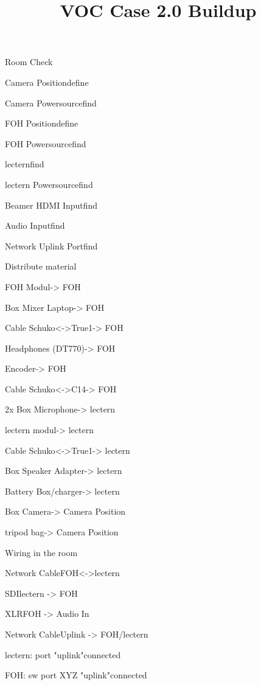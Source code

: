 \def\papersize{4}




\title{VOC Case 2.0 Buildup}

\begin{checklist}{Room Check}
  \item{Camera Position}{define}
  \item{Camera Powersource}{find}
  \item{FOH Position}{define}
  \item{FOH Powersource}{find}
  \item{lectern}{find}
  \item{lectern Powersource}{find}
  \item{Beamer HDMI Input}{find}
  \item{Audio Input}{find}
  \item{Network Uplink Port}{find}
\end{checklist}

\begin{checklist}{Distribute material}
  \item{FOH Modul}{-> FOH}
  \item{Box Mixer Laptop}{-> FOH}
  \item{Cable Schuko<->True1}{-> FOH}
  \item{Headphones (DT770)}{-> FOH}
  \item{Encoder}{-> FOH}
  \item{Cable Schuko<->C14}{-> FOH}
  \item{}{}
  \item{2x Box Microphone}{-> lectern}
  \item{lectern modul}{-> lectern}
  \item{Cable Schuko<->True1}{-> lectern}
  \item{Box Speaker Adapter}{-> lectern}
  \item{Battery Box/charger}{-> lectern}
  \item{Box Camera}{-> Camera Position}
  \item{tripod bag}{-> Camera Position}
\end{checklist}

\begin{checklist}{Wiring in the room}
  \item{Network Cable}{FOH<->lectern}
  \item{SDI}{lectern -> FOH}
  \item{XLR}{FOH -> Audio In}
  \item{Network Cable}{Uplink -> FOH/lectern}
  \item{lectern: port "uplink"}{connected}
  \item{FOH: sw port XYZ "uplink"}{connected}
\end{checklist}

